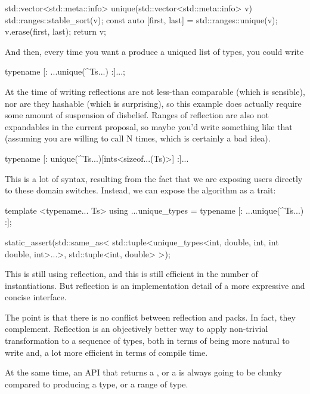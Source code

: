\documentclass{wg21}
\begin{document}
\begin{colorblock}
std::vector<std::meta::info> unique(std::vector<std::meta::info> v) {
    std::ranges::stable_sort(v);
    const auto [first, last] = std::ranges::unique(v);
    v.erase(first, last);
    return v;
}
\end{colorblock}
And then, every time you want a produce a uniqued list of types, you could write
\begin{colorblock}
typename [: ...unique({^Ts...}) :]...;
\end{colorblock}

At the time of writing reflections are not less-than comparable (which is sensible), nor are they hashable (which is surprising),
so this example does actually require some amount of suspension of disbelief.
Ranges of reflection are also not expandables in the current proposal, so maybe you'd write something like that
(assuming you are willing to call  N times, which is certainly a bad idea).

\begin{colorblock}
typename [: unique({^Ts...})[ints<sizeof...(Ts)>] :]...
\end{colorblock}

This is a lot of syntax, resulting from the fact that we are exposing users directly to these domain switches.
Instead, we can expose the algorithm as a trait:

\begin{colorblock}
template <typename... Ts>
using ...unique_types = typename [: ...unique({^Ts...}) :];
\end{colorblock}

\begin{colorblock}
static_assert(std::same_as<
    std::tuple<unique_types<int, double, int, int double, int>...>,
    std::tuple<int, double>
>);
\end{colorblock}

This is still using reflection, and this is still efficient in the number of instantiations.
But reflection is an implementation detail of a more expressive and concise interface.

The point is that there is no conflict between reflection and packs.
In fact, they complement.
Reflection is an objectively better way to apply non-trivial transformation to a sequence of types,
both in terms of being more natural to write and, a lot more efficient in terms of compile time.

At the same time, an API that returns a , or a 
is always going to be clunky compared to producing a type, or a range of type.
\end{document}
